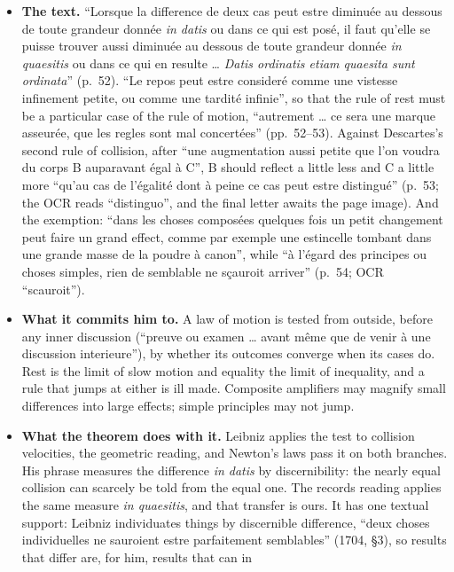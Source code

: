 \documentclass[11pt,a4paper]{article}
\newcommand{\tightlist}{\setlength{\itemsep}{0pt}\setlength{\parskip}{0pt}}
\begin{document}
\begin{itemize}
\tightlist
\item
  \textbf{The text.} ``Lorsque la difference de deux cas peut estre
  diminuée au dessous de toute grandeur donnée \emph{in datis} ou dans
  ce qui est posé, il faut qu'elle se puisse trouver aussi diminuée au
  dessous de toute grandeur donnée \emph{in quaesitis} ou dans ce qui en
  resulte \ldots{} \emph{Datis ordinatis etiam quaesita sunt ordinata}''
  (p.~52). ``Le repos peut estre consideré comme une vistesse infinement
  petite, ou comme une tardité infinie'', so that the rule of rest must
  be a particular case of the rule of motion, ``autrement \ldots{} ce
  sera une marque asseurée, que les regles sont mal concertées''
  (pp.~52--53). Against Descartes's second rule of collision, after
  ``une augmentation aussi petite que l'on voudra du corps B auparavant
  égal à C'', B should reflect a little less and C a little more ``qu'au
  cas de l'égalité dont à peine ce cas peut estre distingué'' (p.~53;
  the OCR reads ``distinguo'', and the final letter awaits the page
  image). And the exemption: ``dans les choses composées quelques fois
  un petit changement peut faire un grand effect, comme par exemple une
  estincelle tombant dans une grande masse de la poudre à canon'', while
  ``à l'égard des principes ou choses simples, rien de semblable ne
  sçauroit arriver'' (p.~54; OCR ``scauroit'').
\item
  \textbf{What it commits him to.} A law of motion is tested from
  outside, before any inner discussion (``preuve ou examen \ldots{}
  avant même que de venir à une discussion interieure''), by whether its
  outcomes converge when its cases do. Rest is the limit of slow motion
  and equality the limit of inequality, and a rule that jumps at either
  is ill made. Composite amplifiers may magnify small differences into
  large effects; simple principles may not jump.
\item
  \textbf{What the theorem does with it.} Leibniz applies the test to
  collision velocities, the geometric reading, and Newton's laws pass it
  on both branches. His phrase measures the difference \emph{in datis}
  by discernibility: the nearly equal collision can scarcely be told
  from the equal one. The records reading applies the same measure
  \emph{in quaesitis}, and that transfer is ours. It has one textual
  support: Leibniz individuates things by discernible difference, ``deux
  choses individuelles ne sauroient estre parfaitement semblables''
  (1704, §3), so results that differ are, for him, results that can in

\end{itemize}
\end{document}
